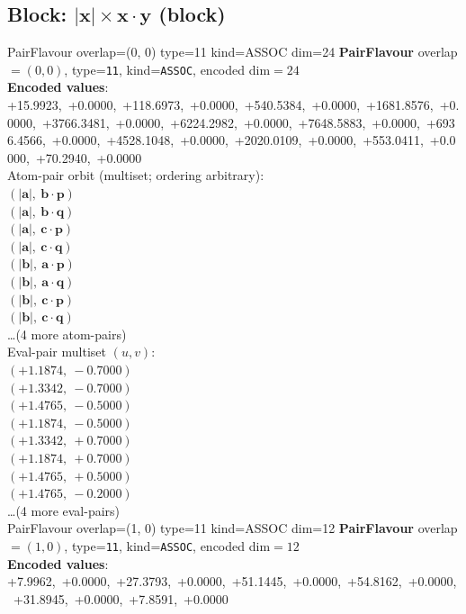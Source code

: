 \documentclass[a4paper,11pt]{article}
\newcommand{\vc}[1]{\ensuremath{\mathbf{#1}}}
\newcommand{\dnfagmiihhiejm}[1]{|\vc{#1}|}
\newcommand{\pdcegfomjfhook}[2]{\mathbf{#1} \cdot \mathbf{#2}}
\begin{document}
\subsection{Block: $\dnfagmiihhiejm{x} \times \pdcegfomjfhook{x}{y}$  (block)}
    PairFlavour  overlap=(0, 0)  type=11  kind=ASSOC  dim=24
\textbf{PairFlavour} overlap$=(0, 0)$, type=\texttt{11}, kind=\texttt{ASSOC}, encoded dim$=24$\\
\textbf{      Encoded values}: +15.9923,\ +0.0000,\ +118.6973,\ +0.0000,\ +540.5384,\ +0.0000,\ +1681.8576,\ +0.0000,\ +3766.3481,\ +0.0000,\ +6224.2982,\ +0.0000,\ +7648.5883,\ +0.0000,\ +6936.4566,\ +0.0000,\ +4528.1048,\ +0.0000,\ +2020.0109,\ +0.0000,\ +553.0411,\ +0.0000,\ +70.2940,\ +0.0000\\
\quad Atom-pair orbit (multiset; ordering arbitrary):\\
$(\dnfagmiihhiejm{a},\ \pdcegfomjfhook{b}{p})$\\
$(\dnfagmiihhiejm{a},\ \pdcegfomjfhook{b}{q})$\\
$(\dnfagmiihhiejm{a},\ \pdcegfomjfhook{c}{p})$\\
$(\dnfagmiihhiejm{a},\ \pdcegfomjfhook{c}{q})$\\
$(\dnfagmiihhiejm{b},\ \pdcegfomjfhook{a}{p})$\\
$(\dnfagmiihhiejm{b},\ \pdcegfomjfhook{a}{q})$\\
$(\dnfagmiihhiejm{b},\ \pdcegfomjfhook{c}{p})$\\
$(\dnfagmiihhiejm{b},\ \pdcegfomjfhook{c}{q})$\\
\quad \ldots (4 more atom-pairs)\\
\quad Eval-pair multiset $(u, v)$:\\
$(+1.1874,\ -0.7000)$\\
$(+1.3342,\ -0.7000)$\\
$(+1.4765,\ -0.5000)$\\
$(+1.1874,\ -0.5000)$\\
$(+1.3342,\ +0.7000)$\\
$(+1.1874,\ +0.7000)$\\
$(+1.4765,\ +0.5000)$\\
$(+1.4765,\ -0.2000)$\\
\quad \ldots (4 more eval-pairs)\\
    PairFlavour  overlap=(1, 0)  type=11  kind=ASSOC  dim=12
\textbf{PairFlavour} overlap$=(1, 0)$, type=\texttt{11}, kind=\texttt{ASSOC}, encoded dim$=12$\\
\textbf{      Encoded values}: +7.9962,\ +0.0000,\ +27.3793,\ +0.0000,\ +51.1445,\ +0.0000,\ +54.8162,\ +0.0000,\ +31.8945,\ +0.0000,\ +7.8591,\ +0.0000\\
\end{document}
